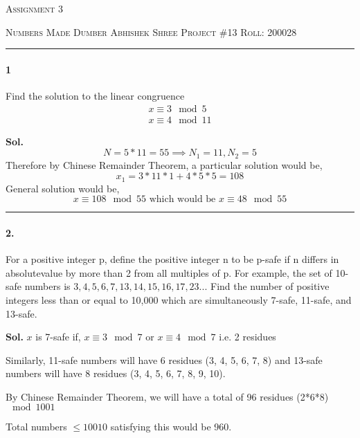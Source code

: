 \documentclass[12pt,oneside,reqno]{amsart}
\begin{document}
\thispagestyle{empty}
\begin{center}
    
    {\scshape \large  Assignment 3}
\end{center}
{\scshape Numbers Made Dumber} \hfill 
\hfill {\scshape Abhishek Shree}
\linebreak
{\scshape Project \#13}  \hfill {\scshape Roll: 200028}


\smallskip

\hrule

\bigskip
\paragraph*{1} Find the solution to the linear congruence 
\begin{gather*}
    x \equiv 3 \mod 5 \\
    x \equiv 4 \mod 11
\end{gather*}

\textbf{Sol.}
 $$N = 5*11 = 55
 \implies N_1 = 11, N_2 = 5$$
Therefore by Chinese Remainder Theorem, a particular solution would be,
$$ x_1 = 3*11*1 + 4*5*5 = 108$$
General solution would be,
$$x \equiv 108 \mod 55 \text{ which would be } \boxed{x \equiv 48 \mod 55}$$


\par\noindent\textcolor{gray}{\rule{\textwidth}{0.5pt}}
\smallskip

\paragraph*{2.} For a positive integer p, define the positive integer n to be p-safe if n differs in absolutevalue by more than 2 from all multiples of p.  For example, the set of 10-safe numbers is $3, 4, 5, 6, 7, 13, 14, 15, 16, 17, 23...$ Find the number of positive integers less than or equal to 10,000 which are simultaneously 7-safe, 11-safe, and 13-safe.

\bigskip
\textbf{Sol.}
$x$ is 7-safe if, $x\equiv 3 \mod 7$ or $x\equiv 4 \mod 7$ i.e. 2 residues

Similarly, 11-safe numbers will have 6 residues (3, 4, 5, 6, 7, 8) and 13-safe numbers will have 8 residues (3, 4, 5, 6, 7, 8, 9, 10).

By Chinese Remainder Theorem, we will have a total of 96 residues (2*6*8) $\mod 1001$

Total numbers $\le10010$ satisfying this would be 960.
\end{document}
